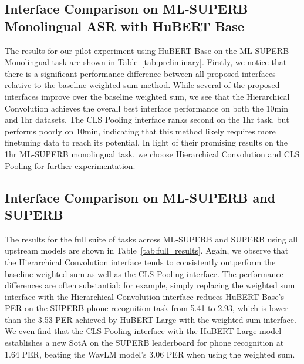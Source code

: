  
\subsection{Interface Comparison on ML-SUPERB Monolingual ASR with HuBERT Base}

The results for our pilot experiment using HuBERT Base on the ML-SUPERB Monolingual task are shown in Table~\ref{tab:preliminary}. Firstly, we notice that there is a significant performance difference between all proposed interfaces relative to the baseline weighted sum method. While several of the proposed interfaces improve over the baseline weighted sum, we see that the Hierarchical Convolution achieves the overall best interface performance on both the 10min and 1hr datasets.
The CLS Pooling interface ranks second on the 1hr task, but performs poorly on 10min, indicating that this method likely requires more finetuning data to reach its potential.
In light of their promising results on the 1hr ML-SUPERB monolingual task, we choose Hierarchical Convolution and CLS Pooling for further experimentation.

\subsection{Interface Comparison on ML-SUPERB and SUPERB}
The results for the full suite of tasks across ML-SUPERB and SUPERB using all upstream models are shown in Table~\ref{tab:full_results}. Again, we observe that the Hierarchical Convolution interface tends to consistently outperform the baseline weighted sum as well as the CLS Pooling interface.
The performance differences are often substantial: for example, simply replacing the weighted sum interface with the Hierarchical Convolution interface reduces HuBERT Base's PER on the SUPERB phone recognition task from 5.41 to 2.93, which is lower than the 3.53 PER achieved by HuBERT Large with the weighted sum interface.
We even find that the CLS Pooling interface with the HuBERT Large model establishes a new SotA on the SUPERB leaderboard for phone recognition at 1.64 PER, beating the WavLM model's 3.06 PER when using the weighted sum.

